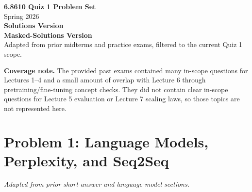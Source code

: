 \usepackage[top=2cm, bottom=2.5cm, left=2.5cm, right=2.5cm]{geometry}
\usepackage{amsmath, amssymb, amsfonts, mathtools}
\usepackage[T1]{fontenc}
\usepackage[utf8]{inputenc}
\usepackage{lmodern}
\usepackage{xcolor}
\usepackage{hyperref}
\usepackage{framed}
\usepackage{enumitem}
\usepackage{array}
\usepackage{xparse}

\hypersetup{
  colorlinks=true,
  linkcolor=blue,
  citecolor=blue,
  urlcolor=blue
}

\setlength{\parindent}{0pt}
\setlength{\parskip}{0.7em}
\renewcommand{\arraystretch}{1.15}

\newcommand{\course}{6.8610 Graduate NLP}
\newcommand{\term}{Spring 2026}
\newcommand{\softmax}{\mathrm{softmax}}




\begin{center}
{\LARGE \textbf{6.8610 Quiz 1 Problem Set}}\\
\term\\
\ifshowsolutions
\textbf{Solutions Version}\\
\else
\textbf{Masked-Solutions Version}\\
\fi
Adapted from prior midterms and practice exams, filtered to the current Quiz 1 scope.
\end{center}

\textbf{Coverage note.} The provided past exams contained many in-scope questions for Lectures 1--4 and a small amount of overlap with Lecture 6 through pretraining/fine-tuning concept checks. They did not contain clear in-scope questions for Lecture 5 evaluation or Lecture 7 scaling laws, so those topics are not represented here.

\section*{Problem 1: Language Models, Perplexity, and Seq2Seq}
\textit{Adapted from prior short-answer and language-model sections.}

